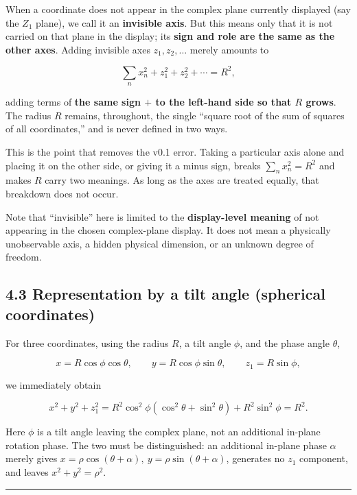 \documentclass[11pt,a4paper]{article}
\begin{document}
When a coordinate does not appear in the complex plane currently
displayed (say the \(Z_1\) plane), we call it an \textbf{invisible
axis}. But this means only that it is not carried on that plane in the
display; its \textbf{sign and role are the same as the other axes}.
Adding invisible axes \(z_1,z_2,\dots\) merely amounts to

\[
\sum_n x_n^2 + z_1^2 + z_2^2 + \cdots = R^2 ,
\]

adding terms of \textbf{the same sign \(+\) to the left-hand side so
that \(R\) grows}. The radius \(R\) remains, throughout, the single
``square root of the sum of squares of all coordinates,'' and is never
defined in two ways.

This is the point that removes the v0.1 error. Taking a particular axis
alone and placing it on the other side, or giving it a minus sign,
breaks \(\sum_n x_n^2=R^2\) and makes \(R\) carry two meanings. As long
as the axes are treated equally, that breakdown does not occur.

Note that ``invisible'' here is limited to the \textbf{display-level
meaning} of not appearing in the chosen complex-plane display. It does
not mean a physically unobservable axis, a hidden physical dimension, or
an unknown degree of freedom.

\subsection{4.3 Representation by a tilt angle (spherical
coordinates)}\label{representation-by-a-tilt-angle-spherical-coordinates}

For three coordinates, using the radius \(R\), a tilt angle \(\phi\),
and the phase angle \(\theta\),

\[
x=R\cos\phi\cos\theta,\qquad y=R\cos\phi\sin\theta,\qquad z_1=R\sin\phi ,
\]

we immediately obtain

\[
x^2+y^2+z_1^2
=R^2\cos^2\phi(\cos^2\theta+\sin^2\theta)+R^2\sin^2\phi
=R^2 .
\]

Here \(\phi\) is a tilt angle leaving the complex plane, not an
additional in-plane rotation phase. The two must be distinguished: an
additional in-plane phase \(\alpha\) merely gives
\(x=\rho\cos(\theta+\alpha),\ y=\rho\sin(\theta+\alpha)\), generates no
\(z_1\) component, and leaves \(x^2+y^2=\rho^2\).

\begin{center}\rule{0.5\linewidth}{0.5pt}\end{center}
\end{document}

